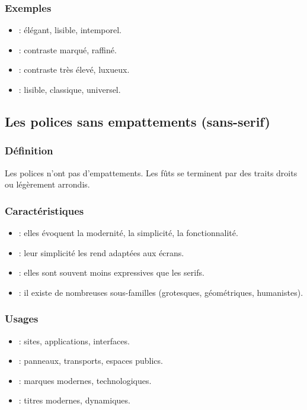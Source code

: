\subsubsection{Exemples}

\begin{itemize}
    \item {} : élégant, lisible, intemporel.
    \item {} : contraste marqué, raffiné.
    \item {} : contraste très élevé, luxueux.
    \item {} : lisible, classique, universel.
\end{itemize}

\subsection{Les polices sans empattements (sans-serif)}

\subsubsection{Définition}

Les polices  n'ont pas d'empattements. Les fûts se terminent par des traits droits ou légèrement arrondis.

\subsubsection{Caractéristiques}

\begin{itemize}
    \item {} : elles évoquent la modernité, la simplicité, la fonctionnalité.
    \item {} : leur simplicité les rend adaptées aux écrans.
    \item {} : elles sont souvent moins expressives que les serifs.
    \item {} : il existe de nombreuses sous-familles (grotesques, géométriques, humanistes).
\end{itemize}

\subsubsection{Usages}

\begin{itemize}
    \item {} : sites, applications, interfaces.
    \item {} : panneaux, transports, espaces publics.
    \item {} : marques modernes, technologiques.
    \item {} : titres modernes, dynamiques.
\end{itemize}

